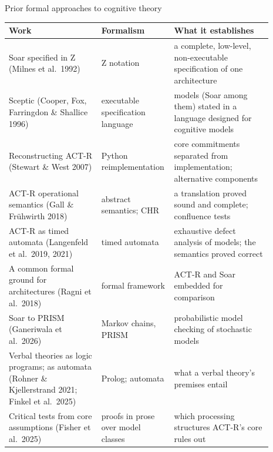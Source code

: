 \documentclass[aspectratio=169,11pt]{beamer}
\begin{document}
\begin{frame}{Prior formal approaches to cognitive theory}
  \scriptsize
  \begin{tabular}{>{\raggedright\arraybackslash}p{0.34\linewidth}>{\raggedright\arraybackslash}p{0.19\linewidth}>{\raggedright\arraybackslash}p{0.36\linewidth}}
    \toprule
    Work & Formalism & What it establishes\\
    \midrule
    Soar specified in Z (Milnes et al.\ 1992) & Z notation & a complete, low-level, non-executable specification of one architecture\\
    Sceptic (Cooper, Fox, Farringdon \& Shallice 1996) & executable specification language & models (Soar among them) stated in a language designed for cognitive models\\
    Reconstructing ACT-R (Stewart \& West 2007) & Python reimplementation & core commitments separated from implementation; alternative components\\
    ACT-R operational semantics (Gall \& Fr\"uhwirth 2018) & abstract semantics; CHR & a translation proved sound and complete; confluence tests\\
    ACT-R as timed automata (Langenfeld et al.\ 2019, 2021) & timed automata & exhaustive defect analysis of models; the semantics proved correct\\
    A common formal ground for architectures (Ragni et al.\ 2018) & formal framework & ACT-R and Soar embedded for comparison\\
    Soar to PRISM (Ganeriwala et al.\ 2026) & Markov chains, PRISM & probabilistic model checking of stochastic models\\
    Verbal theories as logic programs; as automata (Rohner \& Kjellerstrand 2021; Finkel et al.\ 2025) & Prolog; automata & what a verbal theory's premises entail\\
    Critical tests from core assumptions (Fisher et al.\ 2025) & proofs in prose over model classes & which processing structures ACT-R's core rules out\\
    \bottomrule
  \end{tabular}
\end{frame}
\end{document}
